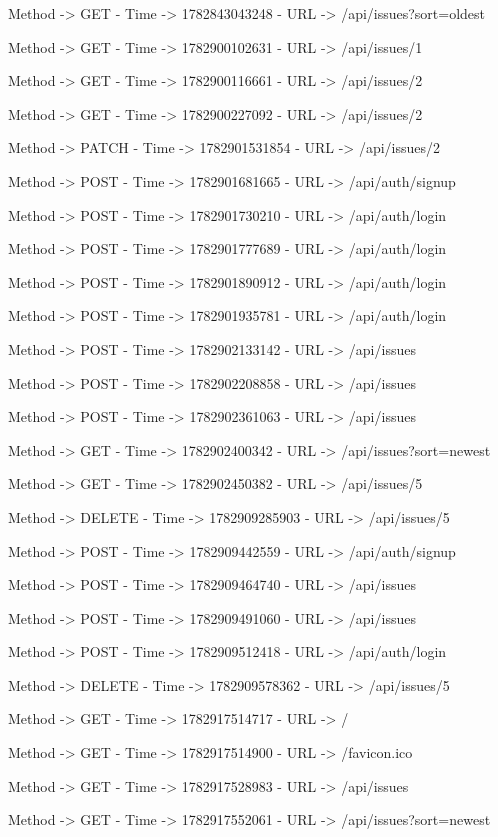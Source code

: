 Method -> GET - Time -> 1782843043248 - URL -> /api/issues?sort=oldest

Method -> GET - Time -> 1782900102631 - URL -> /api/issues/1

Method -> GET - Time -> 1782900116661 - URL -> /api/issues/2

Method -> GET - Time -> 1782900227092 - URL -> /api/issues/2

Method -> PATCH - Time -> 1782901531854 - URL -> /api/issues/2

Method -> POST - Time -> 1782901681665 - URL -> /api/auth/signup

Method -> POST - Time -> 1782901730210 - URL -> /api/auth/login

Method -> POST - Time -> 1782901777689 - URL -> /api/auth/login

Method -> POST - Time -> 1782901890912 - URL -> /api/auth/login

Method -> POST - Time -> 1782901935781 - URL -> /api/auth/login

Method -> POST - Time -> 1782902133142 - URL -> /api/issues

Method -> POST - Time -> 1782902208858 - URL -> /api/issues

Method -> POST - Time -> 1782902361063 - URL -> /api/issues

Method -> GET - Time -> 1782902400342 - URL -> /api/issues?sort=newest

Method -> GET - Time -> 1782902450382 - URL -> /api/issues/5

Method -> DELETE - Time -> 1782909285903 - URL -> /api/issues/5

Method -> POST - Time -> 1782909442559 - URL -> /api/auth/signup

Method -> POST - Time -> 1782909464740 - URL -> /api/issues

Method -> POST - Time -> 1782909491060 - URL -> /api/issues

Method -> POST - Time -> 1782909512418 - URL -> /api/auth/login

Method -> DELETE - Time -> 1782909578362 - URL -> /api/issues/5

Method -> GET - Time -> 1782917514717 - URL -> /

Method -> GET - Time -> 1782917514900 - URL -> /favicon.ico

Method -> GET - Time -> 1782917528983 - URL -> /api/issues

Method -> GET - Time -> 1782917552061 - URL -> /api/issues?sort=newest
